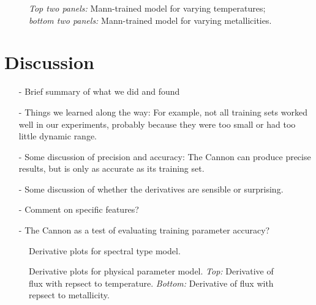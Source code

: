 \documentclass[modern]{aastex62}
\begin{document}
\begin{figure}[ht]
\caption{\textit{Top two panels:} Mann-trained model for varying temperatures; \textit{bottom two panels:} Mann-trained model for varying metallicities.} \label{fig:mann_demo}
\end{figure}


\section{Discussion} \label{sec:discussion}

\begin{enumerate}
\item[-] Brief summary of what we did and found

\item[-] Things we learned along the way: For example, not all training sets worked well in our experiments, probably because they were too small or had too little dynamic range.

\item[-] Some discussion of precision and accuracy: The Cannon can produce precise results, but is only as accurate as its training set. 

\item[-] Some discussion of whether the derivatives are sensible or surprising. \color{red}{Add derivative plots.}\color{black}

\item[-] Comment on specific features? \color{red}{Can easily plot some line lists, but not sure where to go with the analysis... What features are important for M dwarfs? Compare derivative plots of specific lines between theory-trained models and data-trained models?}\color{black}

\item[-] The Cannon as a test of evaluating training parameter accuracy? 
\end{enumerate}

\begin{figure}[ht]
\caption{Derivative plots for spectral type model.} \label{fig:west_derivative}
\end{figure}

\begin{figure}[ht]
\caption{Derivative plots for physical parameter model. \textit{Top:} Derivative of flux with repsect to temperature. \textit{Bottom:} Derivative of flux with repsect to metallicity.} \label{fig:mann_derivative}
\end{figure}


\clearpage


\end{document}
